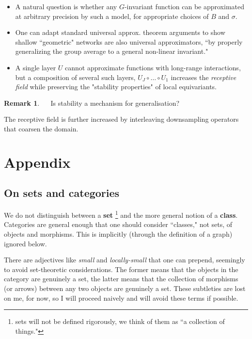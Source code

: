 \documentclass[12pt]{article}
\numberwithin{equation}{section}
\theoremstyle{definition}
\newtheorem{rmk}[thm]{Remark}
\newcommand{		\n		}	{	\noindent					} %
\newcommand{		\B		}	{\textbf					} %
\newcommand{		\1		}	{	\bm{1}					}%
\begin{document}
\begin{itemize}
\item A natural question is whether any $G$-invariant function can be approximated at arbitrary precision by such a model, for appropriate choices of $B$ and $\sigma$. 

\item One can adapt standard universal approx. theorem arguments to show shallow ``geometric" networks are also universal approximators, ``by properly generalizing the group average to a general non-linear invariant." 

\item A single layer $U$ cannot approximate functions with long-range interactions, but a composition of several such layers, $U_J \circ \dots \circ U_1$ increases the \emph{receptive field} while preserving the "stability properties" of local equivariants. 

\end{itemize}

\n\hrulefill
\begin{rmk}
$\quad$ Is stability a mechanism for generalisation?
\end{rmk}
\n\hrulefill



The receptive field is further increased by interleaving downsampling operators that coarsen the domain.



\newpage

\appendix

\section{Appendix}

\subsection{On sets and categories}

We do not distinguish between a \B{set} \footnote{sets will not be defined rigorously, we think of them as ``a collection of things."} and the more general notion of a \B{class}. Categories are general enough that one should consider ``classes," not sets, of objects and morphisms. This is implicitly (through the definition of a graph) ignored below. 

There are adjectives like \emph{small} and \emph{locally-small} that one can prepend, seemingly to avoid set-theoretic considerations. The former means that the objects in the category are genuinely a set, the latter means that the collection of morphisms (or arrows) between any two objects are genuinely a set. These subtleties are lost on me, for now, so I will proceed naively and will avoid these terms if possible.  
\end{document}
